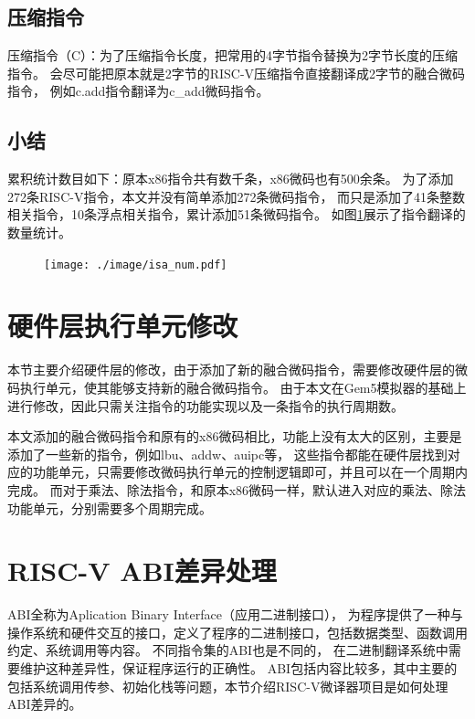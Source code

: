 \subsection{压缩指令}
压缩指令（C）：为了压缩指令长度，把常用的4字节指令替换为2字节长度的压缩指令。
会尽可能把原本就是2字节的RISC-V压缩指令直接翻译成2字节的融合微码指令，
例如c.add指令翻译为c\_add微码指令。



\subsection{小结}

累积统计数目如下：原本x86指令共有数千条，x86微码也有500余条。
为了添加272条RISC-V指令，本文并没有简单添加272条微码指令，
而只是添加了41条整数相关指令，10条浮点相关指令，累计添加51条微码指令。
如图\ref{img:isa_num}展示了指令翻译的数量统计。


\begin{figure}[!htbp]
  \centering
  \texttt{[image: ./image/isa\_num.pdf]}
  \label{img:isa_num}
\end{figure}

\section{硬件层执行单元修改}

本节主要介绍硬件层的修改，由于添加了新的融合微码指令，需要修改硬件层的微码执行单元，使其能够支持新的融合微码指令。
由于本文在Gem5模拟器的基础上进行修改，因此只需关注指令的功能实现以及一条指令的执行周期数。

本文添加的融合微码指令和原有的x86微码相比，功能上没有太大的区别，主要是添加了一些新的指令，例如lbu、addw、auipc等，
这些指令都能在硬件层找到对应的功能单元，只需要修改微码执行单元的控制逻辑即可，并且可以在一个周期内完成。
而对于乘法、除法指令，和原本x86微码一样，默认进入对应的乘法、除法功能单元，分别需要多个周期完成。


\section{RISC-V ABI差异处理}
ABI全称为Aplication Binary Interface（应用二进制接口），
为程序提供了一种与操作系统和硬件交互的接口，定义了程序的二进制接口，包括数据类型、函数调用约定、系统调用等内容。
不同指令集的ABI也是不同的，
在二进制翻译系统中需要维护这种差异性，保证程序运行的正确性。
ABI包括内容比较多，其中主要的包括系统调用传参、初始化栈等问题，本节介绍RISC-V微译器项目是如何处理ABI差异的。


